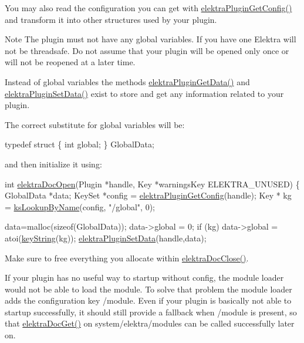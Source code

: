 You may also read the configuration you can get with \hyperlink{group__plugin_ga644bead796506c172817724051c977c9}{elektra\-Plugin\-Get\-Config()} and transform it into other structures used by your plugin.

\begin{DoxyNote}{Note}
The plugin must not have any global variables. If you have one Elektra will not be threadsafe. Do not assume that your plugin will be opened only once or will not be reopened at a later time.
\end{DoxyNote}
Instead of global variables the methods \hyperlink{group__plugin_gaafcf3216b46292f222b8cc7828b4dd20}{elektra\-Plugin\-Get\-Data()} and \hyperlink{group__plugin_gaf4b941a52ff55d0ca2a9158d90208ef2}{elektra\-Plugin\-Set\-Data()} exist to store and get any information related to your plugin.

The correct substitute for global variables will be\-:


\begin{DoxyCodeInclude}
\textcolor{keyword}{typedef} \textcolor{keyword}{struct }\{ \textcolor{keywordtype}{int} global; \} GlobalData;
\end{DoxyCodeInclude}
 and then initialize it using\-:


\begin{DoxyCodeInclude}
\textcolor{keywordtype}{int} \hyperlink{group__plugin_ga23c2eb3584e38a4d494eb8f91e5e3d8d}{elektraDocOpen}(Plugin *handle, Key *warningsKey 
      ELEKTRA\_UNUSED)
\{
        GlobalData *data;
        KeySet *config = \hyperlink{group__plugin_ga644bead796506c172817724051c977c9}{elektraPluginGetConfig}(handle);
        Key * kg = \hyperlink{group__keyset_gad2e30fb6d4739d917c5abb2ac2f9c1a1}{ksLookupByName}(config, \textcolor{stringliteral}{"/global"}, 0);

        data=malloc(\textcolor{keyword}{sizeof}(GlobalData));
        data->global = 0;
        \textcolor{keywordflow}{if} (kg) data->global = atoi(\hyperlink{group__keyvalue_ga880936f2481d28e6e2acbe7486a21d05}{keyString}(kg));
        \hyperlink{group__plugin_gaf4b941a52ff55d0ca2a9158d90208ef2}{elektraPluginSetData}(handle,data);
\end{DoxyCodeInclude}
 Make sure to free everything you allocate within \hyperlink{group__plugin_ga1236aefe5b2baf8b7bf636ba5aa9ea29}{elektra\-Doc\-Close()}.

If your plugin has no useful way to startup without config, the module loader would not be able to load the module. To solve that problem the module loader adds the configuration key /module. Even if your plugin is basically not able to startup successfully, it should still provide a fallback when /module is present, so that \hyperlink{group__plugin_gacb69f3441c6d84241b4362f958fbe313}{elektra\-Doc\-Get()} on system/elektra/modules can be called successfully later on.


